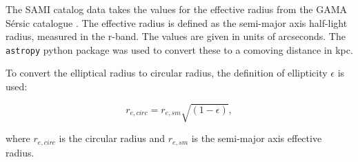 The SAMI catalog data takes the values for the effective radius from the GAMA Sérsic catalogue \parencite{Kelvin2012}. The effective radius is defined as the semi-major axis half-light radius, measured in the r-band. The values are given in units of arcseconds. The \texttt{astropy} python package was used to convert these to a comoving distance in kpc.


To convert the elliptical radius to circular radius, the definition of ellipticity $\epsilon$ is used:

\begin{equation}
   r_{e, circ} = r_{e,sm}\sqrt{(1-\epsilon)},
\end{equation}

where $r_{e, circ}$ is the circular radius and $r_{e,sm}$ is the semi-major axis effective radius.
